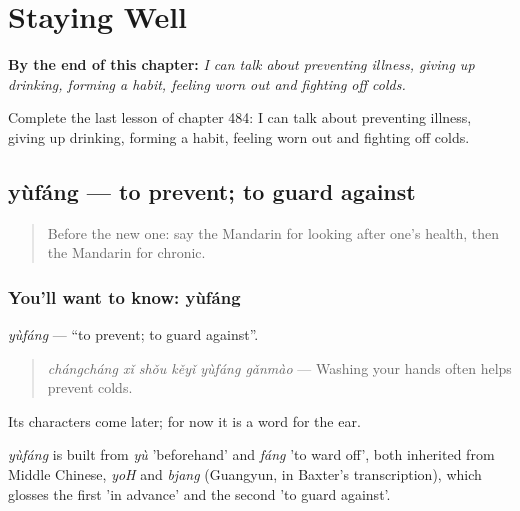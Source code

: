 
\chapter{Staying Well}
\label{ch:zh-staying-well}

\begin{chapteropening}
\textbf{By the end of this chapter:} \emph{I can talk about preventing illness, giving up drinking, forming a habit, feeling worn out and fighting off colds.}

Complete the last lesson of chapter 484: I can talk about preventing illness, giving up drinking, forming a habit, feeling worn out and fighting off colds.
\end{chapteropening}

\section[yùfáng]{yùfáng — to prevent; to guard against}

\label{lesson:ZH-C484-yufang}



\begin{quote}
Before the new one: say the Mandarin for looking after one's health, then the Mandarin for chronic.
\end{quote}

\subsection*{You'll want to know: yùfáng}
\emph{yùfáng} — \textquotedblleft{}to prevent; to guard against\textquotedblright{}.

\begin{quote}
\emph{chángcháng xǐ shǒu kěyǐ yùfáng gǎnmào} — Washing your hands often helps prevent colds.
\end{quote}

Its characters come later; for now it is a word for the ear.

\begin{cousinweb}
\emph{yùfáng} is built from \emph{yù} 'beforehand' and \emph{fáng} 'to ward off', both inherited from Middle Chinese, \emph{yoH} and \emph{bjang} (Guangyun, in Baxter's transcription), which glosses the first 'in advance' and the second 'to guard against'.
\end{cousinweb}

